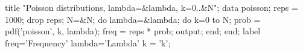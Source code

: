 \begin{listing}
title "Poisson distributions, lambda=&lambda, k=0..&N";
data poisson;
   reps = 1000;
   drop reps;
   N=&N;
   do lambda=&lambda;
      do k=0 to N;
         prob = pdf('poisson', k, lambda);
         freq = reps * prob;
         output;
         end;
      end;
   label freq='Frequency'
        lambda='Lambda'
        k = 'k';
\end{listing}
